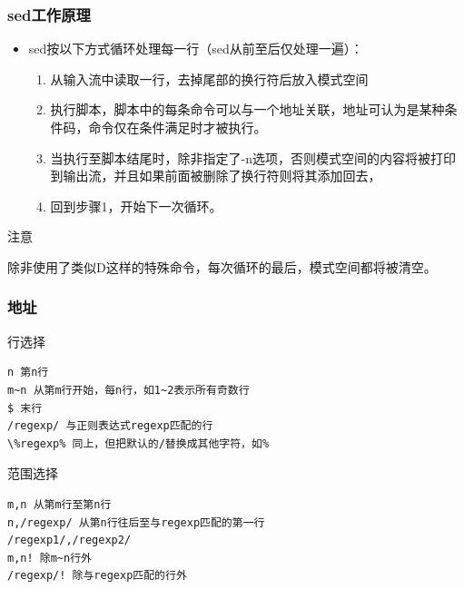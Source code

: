 \documentclass[xcolor=svgnames,presentation]{beamer}
\begin{document}
\begin{frame}
\frametitle{sed工作原理}
\label{sec-2-1-3}
\begin{itemize}

\item sed按以下方式循环处理每一行（sed从前至后仅处理一遍）：
\label{sec-2-1-3-1}%
\begin{enumerate}
\item 从输入流中读取一行，去掉尾部的换行符后放入模式空间
\item 执行脚本，脚本中的每条命令可以与一个地址关联，地址可认为是某种条件码，命令仅在条件满足时才被执行。
\item 当执行至脚本结尾时，除非指定了-n选项，否则模式空间的内容将被打印到输出流，并且如果前面被删除了换行符则将其添加回去，
\item 回到步骤1，开始下一次循环。
\end{enumerate}
\end{itemize} %
\begin{block}{注意}
\label{sec-2-1-3-2}

除非使用了类似D这样的特殊命令，每次循环的最后，模式空间都将被清空。
\end{block}
\end{frame}
\begin{frame}[fragile]
\frametitle{地址}
\label{sec-2-1-4}
\begin{exampleblock}{行选择}
\label{sec-2-1-4-1}


\begin{verbatim}
n 第n行
m~n 从第m行开始，每n行，如1~2表示所有奇数行
$ 末行
/regexp/ 与正则表达式regexp匹配的行
\%regexp% 同上，但把默认的/替换成其他字符，如%
\end{verbatim}
\end{exampleblock}
\begin{block}{范围选择}
\label{sec-2-1-4-2}


\begin{verbatim}
m,n 从第m行至第n行
n,/regexp/ 从第n行往后至与regexp匹配的第一行
/regexp1/,/regexp2/
m,n! 除m~n行外
/regexp/! 除与regexp匹配的行外
\end{verbatim}
\end{block}
\end{frame}
\end{document}
